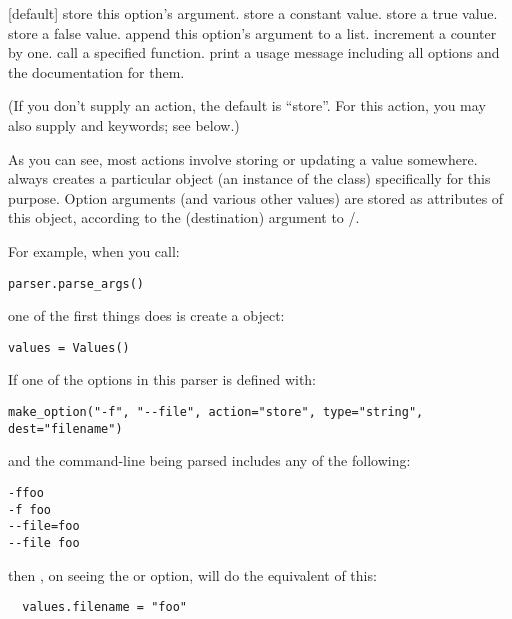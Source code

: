 \begin{definitions}
 [default]
store this option's argument.
store a constant value.
store a true value.
store a false value.
append this option's argument to a list.
increment a counter by one.
call a specified function.
print a usage message including all options and the documentation for
them.
\end{definitions}

(If you don't supply an action, the default is ``store''.  For this
action, you may also supply  and  keywords; see
below.)

As you can see, most actions involve storing or updating a value
somewhere.  always creates a particular object (an
instance of the  class) specifically for this
purpose. Option arguments (and various other values) are stored as
attributes of this object, according to the  (destination)
argument to /.

For example, when you call:

\begin{verbatim}
parser.parse_args()
\end{verbatim}

one of the first things  does is create a
 object:

\begin{verbatim}
values = Values()
\end{verbatim}

If one of the options in this parser is defined with:

\begin{verbatim}
make_option("-f", "--file", action="store", type="string", dest="filename")
\end{verbatim}

and the command-line being parsed includes any of the following:

\begin{verbatim}
-ffoo
-f foo
--file=foo
--file foo
\end{verbatim}

then , on seeing the  or
 option, will do the equivalent of this:

\begin{verbatim}
  values.filename = "foo"
\end{verbatim}

